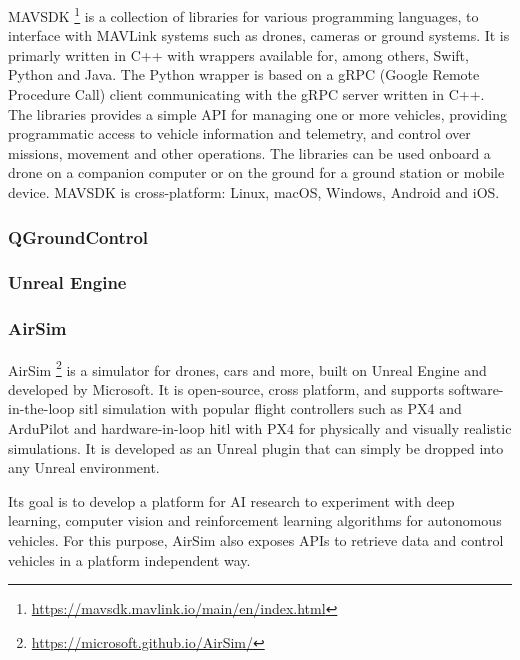 MAVSDK \footnote{\url{https://mavsdk.mavlink.io/main/en/index.html}} is a collection of libraries for various programming languages,
to interface with MAVLink systems such as drones, cameras or ground systems.
It is primarly written in C++ with wrappers available for,
among others, Swift, Python and Java.
The Python wrapper is based on a gRPC (Google Remote Procedure Call) client communicating with the gRPC server written in C++.
The libraries provides a simple API for managing one or more vehicles, 
providing programmatic access to vehicle information and telemetry, 
and control over missions, movement and other operations.
The libraries can be used onboard a drone on a companion computer
or on the ground for a ground station or mobile device.
MAVSDK is cross-platform: Linux, macOS, Windows, Android and iOS.


\subsubsection{QGroundControl}
\label{subsec:qgc}


\subsubsection{Unreal Engine}
\label{subsec:unreal}


\subsubsection{AirSim}
\label{subsec:airsim}
AirSim \footnote{\url{https://microsoft.github.io/AirSim/}} is a simulator for drones, cars and more, built on Unreal Engine and developed by Microsoft. It is open-source, cross platform, and supports software-in-the-loop \gls{sitl} simulation with popular flight controllers such as PX4 and ArduPilot and hardware-in-loop \gls{hitl} with PX4 for physically and visually realistic simulations. It is developed as an Unreal plugin that can simply be dropped into any Unreal environment.

Its goal is to develop a platform for AI research to experiment with deep learning, computer vision and reinforcement learning algorithms for autonomous vehicles. For this purpose, AirSim also exposes APIs to retrieve data and control vehicles in a platform independent way.

